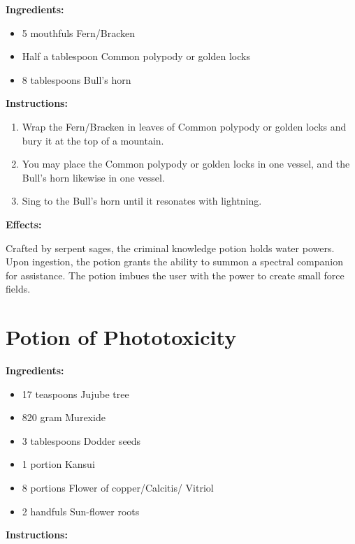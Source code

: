 \documentclass{article}
\begin{document}
\textbf{Ingredients:}

\begin{itemize}
  \item 5 mouthfuls Fern/Bracken
  \item Half a tablespoon Common polypody or golden locks
  \item 8 tablespoons Bull's horn
\end{itemize}

\textbf{Instructions:}

\begin{enumerate}
  \item Wrap the Fern/Bracken in leaves of Common polypody or golden locks and bury it at the top of a mountain.
  \item You may place the Common polypody or golden locks in one vessel, and the Bull's horn likewise in one vessel.
  \item Sing to the Bull's horn until it resonates with lightning.
\end{enumerate}

\textbf{Effects:}

Crafted by serpent sages, the criminal knowledge potion holds water powers. Upon ingestion, the potion grants the ability to summon a spectral companion for assistance. The potion imbues the user with the power to create small force fields.

\newpage
\section*{Potion of Phototoxicity}

\textbf{Ingredients:}

\begin{itemize}
  \item 17 teaspoons Jujube tree
  \item 820 gram Murexide
  \item 3 tablespoons Dodder seeds
  \item 1 portion Kansui
  \item 8 portions Flower of copper/Calcitis/ Vitriol
  \item 2 handfuls Sun-flower roots
\end{itemize}

\textbf{Instructions:}
\end{document}
